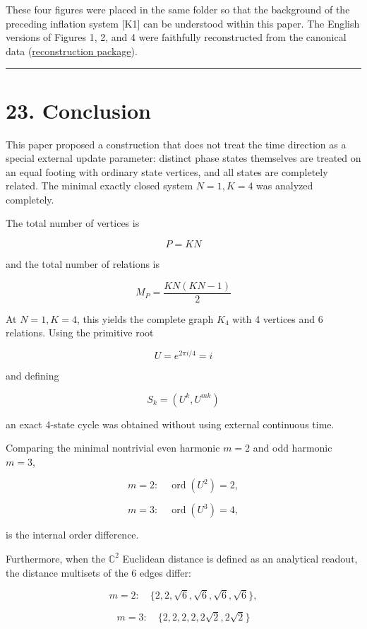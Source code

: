 \documentclass[
  a4paper,
]{article}
\begin{document}
These four figures were placed in the same folder so that the background
of the preceding inflation system {[}K1{]} can be understood within this
paper. The English versions of Figures 1, 2, and 4 were faithfully
reconstructed from the canonical data
(\href{english_figures_inflation_en_20260915/}{reconstruction package}).

\begin{center}\rule{0.5\linewidth}{0.5pt}\end{center}

\section{23. Conclusion}\label{conclusion}

This paper proposed a construction that does not treat the time
direction as a special external update parameter: distinct phase states
themselves are treated on an equal footing with ordinary state vertices,
and all states are completely related. The minimal exactly closed system
\(N=1, K=4\) was analyzed completely.

The total number of vertices is

\[
P=KN
\]

and the total number of relations is

\[
M_P
=
\frac{KN(KN-1)}2
\]

At \(N=1, K=4\), this yields the complete graph \(K_4\) with 4 vertices
and 6 relations. Using the primitive root

\[
U=e^{2\pi i/4}=i
\]

and defining

\[
S_k=(U^k,U^{mk})
\]

an exact 4-state cycle was obtained without using external continuous
time.

Comparing the minimal nontrivial even harmonic \(m=2\) and odd harmonic
\(m=3\),

\[
m=2:
\quad
\operatorname{ord}(U^2)=2,
\]

\[
m=3:
\quad
\operatorname{ord}(U^3)=4,
\]

is the internal order difference.

Furthermore, when the \(\mathbb C^2\) Euclidean distance is defined as
an analytical readout, the distance multisets of the 6 edges differ:

\[
m=2:
\quad
\{2,2,\sqrt6,\sqrt6,\sqrt6,\sqrt6\},
\]

\[
m=3:
\quad
\{2,2,2,2,2\sqrt2,2\sqrt2\}
\]
\end{document}
